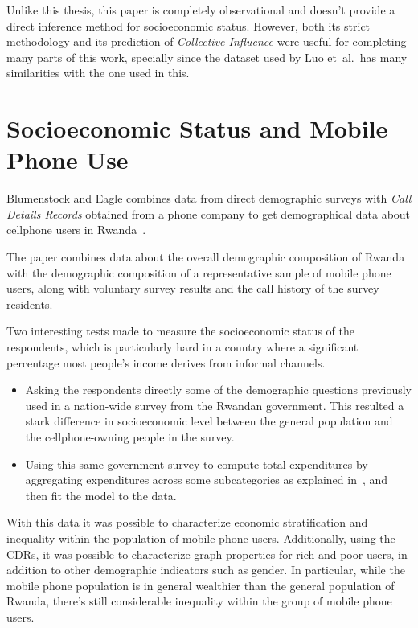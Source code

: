 Unlike this thesis, this paper is completely observational and doesn't provide a direct inference method for socioeconomic status. However, both its strict methodology and its prediction of \emph{Collective Influence} were useful for completing many parts of this work, specially since the dataset used by Luo et~al.\ has many similarities with the one used in this.


\section{Socioeconomic Status and Mobile Phone Use}

Blumenstock and Eagle combines data from direct demographic surveys with \emph{Call Details Records} obtained from a phone company to get demographical data about cellphone users in Rwanda~\cite{blumenstock2010mobile}.

The paper combines data about the overall demographic composition of Rwanda with the demographic composition of a representative sample of mobile phone users, along with voluntary survey results and the call history of the survey residents.

Two interesting tests made to measure the socioeconomic status of the respondents, which is particularly hard in a country where a significant percentage most people's income derives from informal channels.

\begin{itemize}
	\item Asking the respondents directly some of the demographic questions previously used in a nation-wide survey from the Rwandan government. This resulted a stark difference in socioeconomic level between the general population and the cellphone-owning people in the survey.
	\item Using this same government survey to compute total expenditures by aggregating expenditures across some subcategories as explained in~\cite{deaton2002}, and then fit the model to the data.
\end{itemize}

With this data it was possible to characterize economic stratification and inequality within the population of mobile phone users. Additionally, using the CDRs, it was possible to characterize graph properties for rich and poor users, in addition to other demographic indicators such as gender. In particular, while the mobile phone population is in general wealthier than the general population of Rwanda, there's still considerable inequality within the group of mobile phone users.

